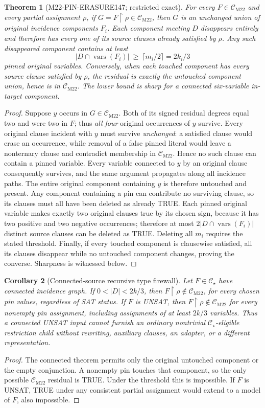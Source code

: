 \documentclass[11pt]{article}
\newtheorem{theorem}{Theorem}
\newtheorem{corollary}[theorem]{Corollary}
\newcommand{\CM}{\mathcal C_{\mathrm{M22}}}
\newcommand{\Cs}{\mathcal C_\star}
\begin{document}
\begin{theorem}[M22-PIN-ERASURE147; restricted exact]
For every \(F\in\CM\) and every partial assignment \(\rho\), if \(G=F\!\restriction\rho\in\CM\), then \(G\) is an unchanged union of original incidence components \(F_i\). Each component meeting \(D\) disappears entirely and therefore has every one of its source clauses already satisfied by \(\rho\). Any such disappeared component contains at least
\[
\boxed{|D\cap\operatorname{vars}(F_i)|\ \ge\ \lceil m_i/2\rceil=2k_i/3}
\]
pinned original variables. Conversely, when each touched component has every source clause satisfied by \(\rho\), the residual is exactly the untouched component union, hence is in \(\CM\). The lower bound is sharp for a connected six-variable in-target component.
\end{theorem}
\begin{proof}
Suppose \(y\) occurs in \(G\in\CM\). Both of its signed residual degrees equal two and were two in \(F\); thus \emph{all four} original occurrences of \(y\) survive. Every original clause incident with \(y\) must survive \emph{unchanged}: a satisfied clause would erase an occurrence, while removal of a false pinned literal would leave a nonternary clause and contradict membership in \(\CM\). Hence no such clause can contain a pinned variable. Every variable connected to \(y\) by an original clause consequently survives, and the same argument propagates along all incidence paths. The entire original component containing \(y\) is therefore untouched and present. Any component containing a pin can contribute no surviving clause, so its clauses must all have been deleted as already TRUE. Each pinned original variable makes exactly two original clauses true by its chosen sign, because it has two positive and two negative occurrences; therefore at most \(2|D\cap\operatorname{vars}(F_i)|\) distinct source clauses can be deleted as TRUE. Deleting all \(m_i\) requires the stated threshold. Finally, if every touched component is clausewise satisfied, all its clauses disappear while no untouched component changes, proving the converse. Sharpness is witnessed below.
\end{proof}

\begin{corollary}[Connected-source recursive type firewall]
Let \(F\in\Cs\) have connected incidence graph. If \(0<|D|<2k/3\), then \(F\!\restriction\rho\notin\CM\), for every chosen pin values, regardless of SAT status. If \(F\) is UNSAT, then \(F\!\restriction\rho\notin\CM\) for \emph{every} nonempty pin assignment, including assignments of at least \(2k/3\) variables. Thus a connected UNSAT input cannot furnish an ordinary nontrivial \(\Cs\)-eligible restriction child without rewriting, auxiliary clauses, an adapter, or a different representation.
\end{corollary}
\begin{proof}
The connected theorem permits only the original untouched component or the empty conjunction. A nonempty pin touches that component, so the only possible \(\CM\) residual is TRUE. Under the threshold this is impossible. If \(F\) is UNSAT, TRUE under any consistent partial assignment would extend to a model of \(F\), also impossible.
\end{proof}
\end{document}
